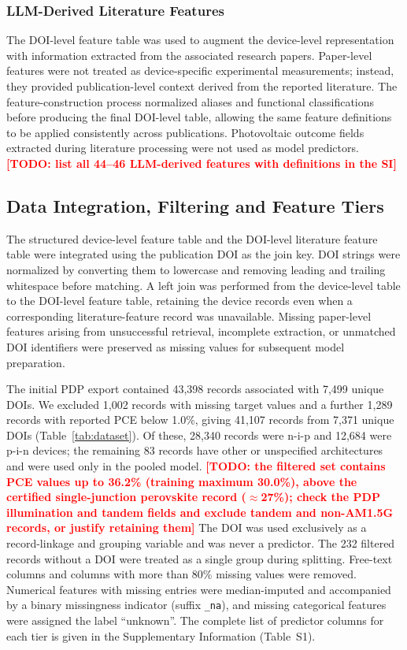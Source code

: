 \documentclass[3p]{elsarticle}
\newcommand{\authortodo}[1]{\textcolor{red}{\textbf{[TODO: #1]}}}
\begin{document}
\subsubsection{LLM-Derived Literature Features}

The DOI-level feature table was used to augment the device-level representation with information extracted from the associated research papers. Paper-level features were not treated as device-specific experimental measurements; instead, they provided publication-level context derived from the reported literature. The feature-construction process normalized aliases and functional classifications before producing the final DOI-level table, allowing the same feature definitions to be applied consistently across publications. Photovoltaic outcome fields extracted during literature processing were not used as model predictors. \authortodo{list all 44--46 LLM-derived features with definitions in the SI}

\subsection{Data Integration, Filtering and Feature Tiers}
\label{sec:integration}

The structured device-level feature table and the DOI-level literature feature table were integrated using the publication DOI as the join key. DOI strings were normalized by converting them to lowercase and removing leading and trailing whitespace before matching. A left join was performed from the device-level table to the DOI-level feature table, retaining the device records even when a corresponding literature-feature record was unavailable. Missing paper-level features arising from unsuccessful retrieval, incomplete extraction, or unmatched DOI identifiers were preserved as missing values for subsequent model preparation.

The initial PDP export contained 43,398 records associated with 7,499 unique DOIs. We excluded 1,002 records with missing target values and a further 1,289 records with reported PCE below 1.0\%, giving 41,107 records from 7,371 unique DOIs (Table~\ref{tab:dataset}). Of these, 28,340 records were n-i-p and 12,684 were p-i-n devices; the remaining 83 records have other or unspecified architectures and were used only in the pooled model. \authortodo{the filtered set contains PCE values up to 36.2\% (training maximum 30.0\%), above the certified single-junction perovskite record ($\approx$27\%); check the PDP illumination and tandem fields and exclude tandem and non-AM1.5G records, or justify retaining them} The DOI was used exclusively as a record-linkage and grouping variable and was never a predictor. The 232 filtered records without a DOI were treated as a single group during splitting. Free-text columns and columns with more than 80\% missing values were removed. Numerical features with missing entries were median-imputed and accompanied by a binary missingness indicator (suffix \texttt{\_na}), and missing categorical features were assigned the label ``unknown''. The complete list of predictor columns for each tier is given in the Supplementary Information (Table~S1).
\end{document}
